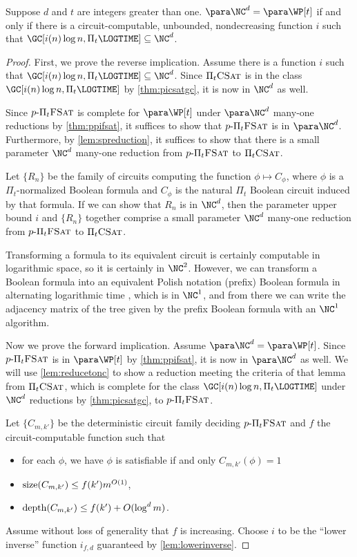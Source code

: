 \begin{theorem}\label{thm:ncwnct}
  Suppose $d$ and $t$ are integers greater than one.
  $\para \NC^d = \para \WP[t]$ if and only if there is a circuit-computable, unbounded, nondecreasing function $i$ such that %
  $\GC[i(n) \log n, \Pi_t \LOGTIME] \subseteq \NC^d$.
\end{theorem}
\begin{proof}
  First, we prove the reverse implication.
  Assume there is a function $i$ such that $\GC[i(n) \log n, \Pi_t \LOGTIME] \subseteq \NC^d$.
  Since $\Pi_t \textsc{CSat}$ is in the class $\GC[i(n) \log n, \Pi_t \LOGTIME]$ by \autoref{thm:picsatgc}, it is now in $\NC^d$ as well.

  Since $p \textnormal{-} \Pi_t \textsc{FSat}$ is complete for $\para \WP[t]$ under $\para \NC^d$ many-one reductions by \autoref{thm:ppifsat}, it suffices to show that $p \textnormal{-} \Pi_t \textsc{FSat}$ is in $\para \NC^d$.
  Furthermore, by \autoref{lem:spreduction}, it suffices to show that there is a small parameter $\NC^d$ many-one reduction from $p \textnormal{-} \Pi_t \textsc{FSat}$ to $\Pi_t \textsc{CSat}$.

  Let $\{R_n\}$ be the family of circuits computing the function $\phi \mapsto C_\phi$, where $\phi$ is a $\Pi_t$-normalized Boolean formula and $C_\phi$ is the natural $\Pi_t$ Boolean circuit induced by that formula.
  If we can show that $R_n$ is in $\NC^d$, then the parameter upper bound $i$ and $\{R_n\}$ together comprise a small parameter $\NC^d$ many-one reduction from $p \textnormal{-} \Pi_t \textsc{FSat}$ to $\Pi_t \textsc{CSat}$.

  Transforming a formula to its equivalent circuit is certainly computable in logarithmic space, so it is certainly in $\NC^2$.
  However, we can transform a Boolean formula into an equivalent Polish notation (prefix) Boolean formula in alternating logarithmic time \autocite{buss87}, which is in $\NC^1$, and from there we can write the adjacency matrix of the tree given by the prefix Boolean formula with an $\NC^1$ algorithm.

  Now we prove the forward implication.
  Assume $\para \NC^d = \para \WP[t]$.
  Since $p \textnormal{-} \Pi_t \textsc{FSat}$ is in $\para \WP[t]$ by \autoref{thm:ppifsat}, it is now in $\para \NC^d$ as well.
  We will use \autoref{lem:reducetonc} to show a reduction meeting the criteria of that lemma from $\Pi_t \textsc{CSat}$, which is complete for the class $\GC[i(n) \log n, \Pi_t \LOGTIME]$ under $\NC^d$ reductions by \autoref{thm:picsatgc}, to $p \textnormal{-} \Pi_t \textsc{FSat}$.

  Let $\{C_{m, k'}\}$ be the deterministic circuit family deciding $p \textnormal{-} \Pi_t \textsc{FSat}$ and $f$ the circuit-computable function such that
  \begin{itemize}
  \item for each $\phi$, we have $\phi$ is satisfiable if and only $C_{m, k'}(\phi) = 1$
  \item $\operatorname{size}(C_{m, k'}) \leq f(k') m^{O(1)}$,
  \item $\operatorname{depth}(C_{m, k'}) \leq f(k') + O(\log^d m)$.
  \end{itemize}
  Assume without loss of generality that $f$ is increasing.
  Choose $i$ to be the ``lower inverse'' function $i_{f, d}$ guaranteed by \autoref{lem:lowerinverse}.


\end{proof}
